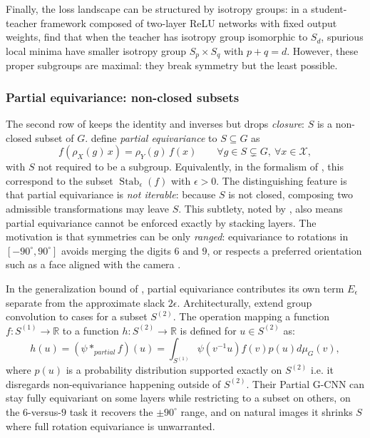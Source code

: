 \documentclass[mathematics,review,submit,moreauthors]{Definitions/mdpi}
\begin{document}
Finally, the loss landscape can be structured by isotropy groups: in a student-teacher framework composed of two-layer ReLU networks with fixed output weights, \citet{arjevani2023} find that when the teacher has isotropy group isomorphic to $S_d$, spurious local minima have smaller isotropy group $S_p\times S_q$ with $p+q=d$.
However, these proper subgroups are maximal: they break symmetry but the least possible.

\subsubsection{Partial equivariance: non-closed subsets}\label{sec:non-closed-subsets}
The second row of  keeps the identity and inverses but drops \emph{closure}: $S$ is a non-closed subset of $G$.
\citet{romero2023} define \emph{partial equivariance} to $S\subseteq G$ as
$$f(\rho_X(g)\,x)=\rho_Y(g)\,f(x)\qquad \forall g\in S\subsetneq G,\ \forall x\in \mathcal{X},$$
with $S$ not required to be a subgroup.
Equivalently, in the formalism of \citet{petrache2023}, this correspond to the subset $\operatorname{Stab}_\epsilon(f)$ with $\epsilon>0$.
The distinguishing feature is that partial equivariance is \emph{not iterable}: because $S$ is not closed, composing two admissible transformations may leave $S$.
This subtlety, noted by \citet{romero2023}, also means partial equivariance cannot be enforced exactly by stacking layers.
The motivation is that symmetries can be only \emph{ranged}: equivariance to rotations in $[-90^\circ,90^\circ]$ avoids merging the digits $6$ and $9$, or respects a preferred orientation such as a face aligned with the camera \citep{romero2023}.

In the generalization bound of \citet{petrache2023}, partial equivariance contributes its own term $E_\epsilon$ separate from the approximate slack $2\epsilon$.
Architecturally, \citet{romero2023} extend group convolution to cases for a subset $S^{(2)}$.
The operation mapping a function $f:S^{(1)}\to\mathbb{R}$ to a function $h:S^{(2)}\to\mathbb{R}$ is defined for $u\in S^{(2)}$ as:$$h(u) = (\psi *_{partial} f)(u) = \int_{S^{(1)}} \psi(v^{-1}u)f(v) p(u) d\mu_{G}(v),$$ where $p(u)$ is a probability distribution supported exactly on $S^{(2)}$ i.e. it disregards non-equivariance happening outside of $S^{(2)}$.
Their Partial G-CNN can stay fully equivariant on some layers while restricting to a subset on others, on the $6$-versus-$9$ task it recovers the $\pm 90^\circ$ range, and on natural images it shrinks $S$ where full rotation equivariance is unwarranted.
\end{document}
